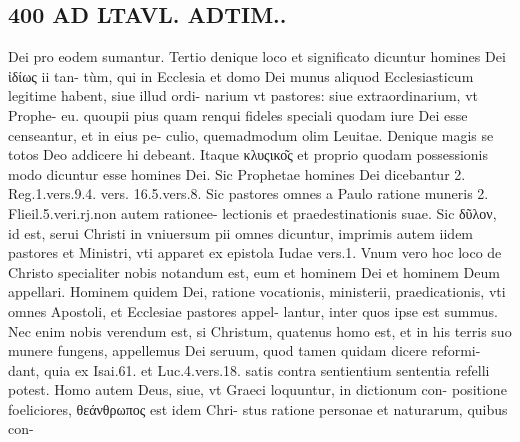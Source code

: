 \documentclass{article}
\begin{document}
\begin{pages}
\section*{400 AD LTAVL. ADTIM.. }\pstart Dei pro eodem sumantur. Tertio denique loco et significato dicuntur homines Dei ἰδίως ii tan- tùm, qui in Ecclesia et domo Dei munus aliquod Ecclesiasticum legitime habent, siue illud ordi- narium vt pastores: siue extraordinarium, vt Prophe- eu. quoupii pius quam renqui fideles speciali quodam iure Dei esse censeantur, et in eius pe- culio, quemadmodum olim Leuitae.  \pend\pstart Denique  magis se totos Deo addicere hi debeant. Itaque κλυςικο͂ς et proprio quodam possessionis modo dicuntur esse homines Dei. Sic Prophetae homines Dei dicebantur 2. Reg.1.vers.9.4. vers. 16.5.vers.8. Sic pastores omnes a Paulo ratione muneris 2. Flieil.5.veri.rj.non autem rationee- lectionis et praedestinationis suae. Sic δῦλον, id est, serui Christi in vniuersum pii omnes dicuntur, imprimis autem iidem pastores et Ministri, vti apparet ex epistola Iudae vers.1.  \pend\pstart Vnum vero hoc loco de Christo specialiter nobis notandum est, eum et hominem Dei et hominem Deum appellari. Hominem quidem Dei, ratione vocationis, ministerii, praedicationis, vti omnes Apostoli, et Ecclesiae pastores appel- lantur, inter quos ipse est summus. Nec enim nobis verendum est, si Christum, quatenus homo est, et in his terris suo munere fungens, appellemus Dei seruum, quod tamen quidam dicere reformi- dant, quia ex Isai.61. et Luc.4.vers.18. satis contra sentientium sententia refelli potest. Homo autem Deus, siue, vt Graeci loquuntur, in dictionum con- positione foeliciores, θεάνθρωπος est idem Chri- stus ratione personae et naturarum, quibus con-  \pend

\end{pages}
\end{document}
